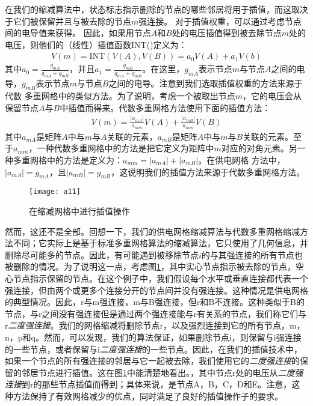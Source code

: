 在我们的缩减算法中，状态标志指示删除的节点的哪些邻居将用于插值，而这取决于它们被保留并且与被去除的节点$m$强连接。 对于插值权重，可以通过考虑节点间的电导值来获得。 因此，如果用节点$A$和$B$处的电压插值得到被去除节点$m$处的电压，则他们的（线性）插值函数INT()定义为：
\begin{align}
V(m)=\text{INT}(V(A),V(B))=a_0V(A)+a_1V(b)
\end{align}
其中$a_0=\frac{g_{mA}}{g_{mA}+g_{mB}}$，并且$a_1=\frac{g_{mB}}{g_{mA}+g_{mB}}$。在这里，$g_{mA}$表示节点$m$与节点$A$之间的电导，$g_{mB}$表示节点$m$与节点$B$之间的电导。注意到我们选取插值权重的方法来源于代数
多重网格中的类似方法。为了说明，考虑一个被取出节点$m$，它的电压会从保留节点$A$与$B$中插值而得来。代数多重网格方法使用下面的插值方法：
\begin{align}
V(m)=\frac{|a_{mA}|}{a_{mm}}V(A)+\frac{|a_{mB}|}{a_{mm}}V(B)
\end{align}
其中$a_{mA}$是矩阵$A$中与$m$与$A$关联的元素，$a_{mB}$是矩阵$A$中与$m$与$B$关联的元素。至于$a_{mm}$，一种代数多重网格中的方法是把它定义为矩阵中$m$对应的对角元素。另一种多重网格中的方法是定义为：$a_{mm}=|a_{mA}|+|a_{mB}|$。在供电网格
方法中，$|a_{mA}|=g_{mA}$，且$|a_{mB}|=g_{mB}$，这说明我们的插值方法来源于代数多重网格方法。

\begin{figure}[H] %
  \centering
  \texttt{[image: a11]}
  \caption{在缩减网格中进行插值操作}
  \label{fig:a11}
\end{figure}

然而，这还不是全部。回想一下，我们的供电网格缩减算法与代数多重网格缩减方法不同；它实际上是基于标准多重网格算法的缩减算法，它只使用了几何信息，并删除尽可能多的节点。因此，有可能遇到被移除节点$i$的与其强连接的所有节点也被删除的情况。为了说明这一点，考虑图\ref{fig:a11}，其中实心节点指示被去除的节点，空心节点指示保留的节点。在这个例子中，我们假设每个水平或垂直连接都代表一个强连接，但由两个或更多个连接分开的节点间并没有强连接。这种情况是供电网格的典型情况。因此，r与m强连接，m与B强连接，但r和B不连接。这种类似于B的节点，与r之间没有强连接但是通过两个强连接能与r有关系的节点，我们称它们与r\emph{二度强连接}。我们的网格缩减将删除节点r，以及强烈连接到它的所有节点，m，n，p和q。然而，可以发现，我们的算法保证，如果删除节点i，则保留与i强连接的一些节点，或者保留与i\emph{二度强连接}的一些节点。因此，在我们的插值技术中，如果一个节点的所有强连接的邻居与它一起被去除，我们使用它的\emph{二度强连接}的保留的邻居节点进行插值。这在图\ref{fig:a11}中能清楚地看出。，其中节点r处的电压从\emph{二度强连接}到r的那些节点插值而得到；具体来说，是节点A，B，C，D和E。注意，这种方法保持了有效网格减少的优点，同时满足了良好的插值操作子的要求。
